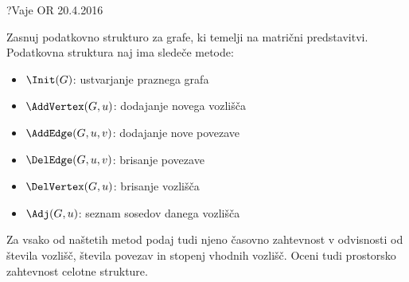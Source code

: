 \begin{naloga}{?}{Vaje OR 20.4.2016}
\begin{vprasanje}
Zasnuj podatkovno strukturo za grafe,
ki temelji na matrični predstavitvi.
Podatkovna struktura naj ima sledeče metode:
\begin{itemize}
\item $\Init(G)$: ustvarjanje praznega grafa
\item $\AddVertex(G, u)$: dodajanje novega vozlišča
\item $\AddEdge(G, u, v)$: dodajanje nove povezave
\item $\DelEdge(G, u, v)$: brisanje povezave
\item $\DelVertex(G, u)$: brisanje vozlišča
\item $\Adj(G, u)$: seznam sosedov danega vozlišča
\end{itemize}
Za vsako od naštetih metod podaj tudi njeno časovno zahtevnost
v odvisnosti od števila vozlišč, števila povezav in stopenj vhodnih vozlišč.
Oceni tudi prostorsko zahtevnost celotne strukture.
\end{vprasanje}
\begin{odgovor}
\end{odgovor}
\end{naloga}
